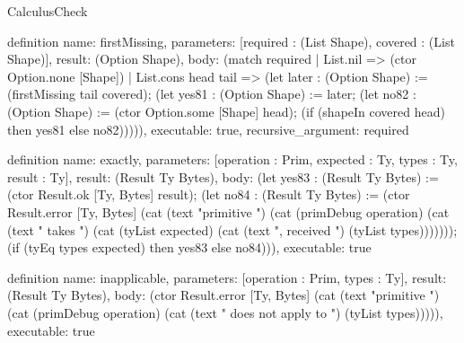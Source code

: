 \begin{lexlean}{CalculusCheck}
\begin{semanticmodule}
definition{
  name: firstMissing,
  parameters: [required : (List Shape), covered : (List Shape)],
  result: (Option Shape),
  body: (match required
    | List.nil => (ctor Option.none [Shape])
    | List.cons head tail => (let later : (Option Shape) := (firstMissing tail covered); (let yes81 : (Option Shape) := later; (let no82 : (Option Shape) := (ctor Option.some [Shape] head); (if (shapeIn covered head) then yes81 else no82))))),
  executable: true,
  recursive_argument: required
}

definition{
  name: exactly,
  parameters: [operation : Prim, expected : Ty, types : Ty, result : Ty],
  result: (Result Ty Bytes),
  body: (let yes83 : (Result Ty Bytes) := (ctor Result.ok [Ty, Bytes] result); (let no84 : (Result Ty Bytes) := (ctor Result.error [Ty, Bytes] (cat (text "primitive ") (cat (primDebug operation) (cat (text " takes ") (cat (tyList expected) (cat (text ", received ") (tyList types))))))); (if (tyEq types expected) then yes83 else no84))),
  executable: true
}

definition{
  name: inapplicable,
  parameters: [operation : Prim, types : Ty],
  result: (Result Ty Bytes),
  body: (ctor Result.error [Ty, Bytes] (cat (text "primitive ") (cat (primDebug operation) (cat (text " does not apply to ") (tyList types))))),
  executable: true
}


\end{semanticmodule}
\end{lexlean}
